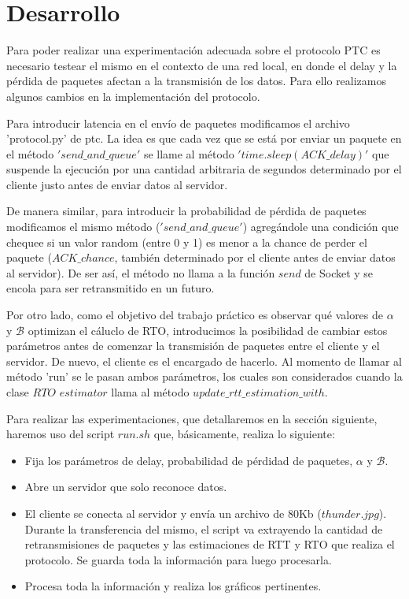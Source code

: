 \section{Desarrollo}
Para poder realizar una experimentaci\'on adecuada sobre el protocolo PTC es necesario testear el mismo en el contexto de una red local, en donde el delay y la p\'erdida de paquetes afectan a la transmisi\'on de los datos. Para ello realizamos algunos cambios en la implementaci\'on del protocolo.

Para introducir latencia en el env\'io de paquetes modificamos el archivo 'protocol.py' de ptc. La idea es que cada vez que se est\'a por enviar un paquete en el m\'etodo $'send\_and\_queue'$ se llame al m\'etodo $'time.sleep(ACK\_delay)'$ que suspende la ejecuci\'on por una cantidad arbitraria de segundos determinado por el cliente justo antes de enviar datos al servidor.

De manera similar, para introducir la probabilidad de p\'erdida de paquetes modificamos el mismo m\'etodo ($'send\_and\_queue'$) agreg\'andole una condici\'on que chequee si un valor random (entre 0 y 1) es menor a la chance de perder el paquete ($ACK\_chance$, tambi\'en determinado por el cliente antes de enviar datos al servidor). De ser as\'i, el m\'etodo no llama a la funci\'on $send$ de Socket y se encola para ser retransmitido en un futuro.

Por otro lado, como el objetivo del trabajo pr\'actico es observar qu\'e valores de $\alpha$ y $\mathcal{B}$ optimizan el c\'aluclo de RTO, introducimos la posibilidad de cambiar estos par\'ametros antes de comenzar la transmisi\'on de paquetes entre el cliente y el servidor. De nuevo, el cliente es el encargado de hacerlo. Al momento de llamar al m\'etodo 'run' se le pasan ambos par\'ametros, los cuales son considerados cuando la clase $RTO$ $estimator$ llama al m\'etodo $update\_rtt\_estimation\_with$.

Para realizar las experimentaciones, que detallaremos en la secci\'on siguiente, haremos uso del script $run.sh$
que, b\'asicamente, realiza lo siguiente:
\begin{itemize}
	\item Fija los par\'ametros de delay, probabilidad de p\'erdidad de paquetes, $\alpha$ y $\mathcal{B}$.
	\item Abre un servidor que solo reconoce datos.
	\item El cliente se conecta al servidor y env\'ia un archivo de 80Kb ($thunder.jpg$). Durante la transferencia del mismo, el script va extrayendo la cantidad de retransmisiones de paquetes y las estimaciones de RTT y RTO que realiza el protocolo. Se guarda toda la informaci\'on para luego procesarla.
	\item Procesa toda la informaci\'on y realiza los gr\'aficos pertinentes.
\end{itemize}